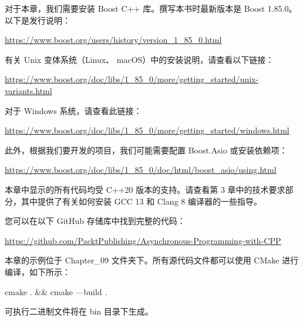 对于本章，我们需要安装 Boost C++ 库。撰写本书时最新版本是 Boost 1.85.0。以下是发行说明：

\url{https://www.boost.org/users/history/version_1_85_0.html}

有关 Unix 变体系统（Linux、 macOS）中的安装说明，请查看以下链接：

\url{https://www.boost.org/doc/libs/1_85_0/more/getting_started/unix-variants.html}

对于 Windows 系统，请查看此链接：

\url{https://www.boost.org/doc/libs/1_85_0/more/getting_started/windows.html}

此外，根据我们要开发的项目，我们可能需要配置 Boost.Asio 或安装依赖项：

\url{https://www.boost.org/doc/libs/1_85_0/doc/html/boost_asio/using.html}

本章中显示的所有代码均受 C++20 版本的支持。请查看第 3 章中的技术要求部分，其中提供了有关如何安装 GCC 13 和 Clang 8 编译器的一些指导。

您可以在以下 GitHub 存储库中找到完整的代码：

\url{https://github.com/PacktPublishing/Asynchronous-Programming-with-CPP}

本章的示例位于 Chapter\_09 文件夹下。所有源代码文件都可以使用 CMake 进行编译，如下所示：

\begin{shell}
cmake . && cmake —build .
\end{shell}

可执行二进制文件将在 bin 目录下生成。

